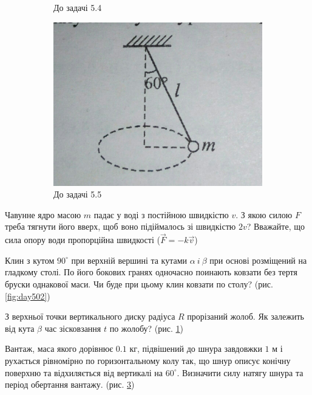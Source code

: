 \begin{problem}{\label{task_51}}
\begin{figure}[h!]
\begin{subfigure}{.4\textwidth}
			\caption{До задачі 5.4}
			\label{fig:day53}
		\end{subfigure}
		\begin{subfigure}{.4\textwidth}
			\centering
			\includegraphics[width=0.5\linewidth]{class5/day5_4}
			\caption{До задачі 5.5}
			\label{fig:day54}
		\end{subfigure}
	\caption{}
	\end{figure}
	
\end{problem}

\begin{problem}{2}
	Чавунне ядро масою $m$ падає у воді з постійною швидкістю $v$. З якою силою $F$ треба тягнути його вверх, щоб воно підіймалось зі швидкістю $2v$? Вважайте, що сила опору води пропорційна швидкості ($\vec{F} = -k\vec{v}$)
\end{problem}

\begin{problem}{3}
	Клин з кутом $90^{\circ}$ при верхній вершині та кутами $\alpha~i~\beta$ при основі розміщений на гладкому столі. По його бокових гранях одночасно поинають ковзати без тертя бруски однакової маси. Чи буде при цьому клин ковзати по столу? (рис. \ref{fig:day502})
	
\end{problem}

\begin{problem}{4}
	З верхньої точки вертикального диску радіуса $R$ прорізаний жолоб. Як залежить від кута $\beta$ час зісковзання $t$ по жолобу? (рис. \ref{fig:day53})
	
\end{problem}

\begin{problem}{5}
	Вантаж, маса якого дорівнює $0.1$ кг, підвішений до шнура завдовжки $1$ м і рухається рівномірно по горизонтальному колу так, що шнур описує конічну поверхню та відхиляється від вертикалі на $60^{\circ}$. Визначити силу натягу шнура та період обертання вантажу. (рис. \ref{fig:day54})
	
\end{problem}

